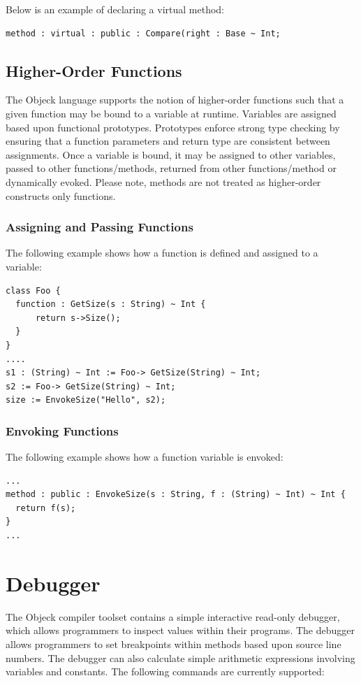 \documentclass[12pt]{article}
\begin{document}
Below is an example of declaring a virtual method:
\begin{verbatim}
method : virtual : public : Compare(right : Base ~ Int;
\end{verbatim}

\subsection{Higher-Order Functions}
The Objeck language supports the notion of higher-order functions such that a given function may be bound to a variable at runtime.  Variables are assigned based upon functional prototypes.  Prototypes enforce strong type checking by ensuring that a function parameters and return type are consistent between assignments.  Once a variable is bound, it may be assigned to other variables, passed to other functions/methods, returned from other functions/method or dynamically evoked.  Please note, methods are not treated as higher-order constructs only functions.  

\subsubsection{Assigning and Passing Functions}
The following example shows how a function is defined and assigned to a variable:
\begin{verbatim}
class Foo {
  function : GetSize(s : String) ~ Int {
      return s->Size();
  }
}
....
s1 : (String) ~ Int := Foo-> GetSize(String) ~ Int;
s2 := Foo-> GetSize(String) ~ Int;
size := EnvokeSize("Hello", s2);
\end{verbatim}

\subsubsection{Envoking Functions}
The following example shows how a function variable is envoked:
\begin{verbatim}
...
method : public : EnvokeSize(s : String, f : (String) ~ Int) ~ Int {
  return f(s);
}
...
\end{verbatim}

\section{Debugger}
The Objeck compiler toolset contains a simple interactive read-only debugger, which allows programmers to inspect values within their programs.  The debugger allows programmers to set breakpoints within methods based upon source line numbers.  The debugger can also calculate simple arithmetic expressions involving variables and constants. The following commands are currently supported:
\end{document}
